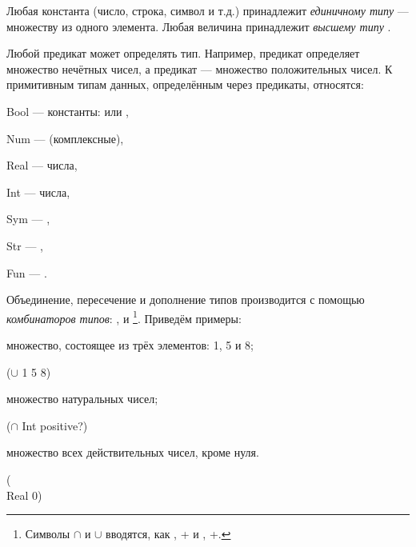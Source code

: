 Любая константа (число, строка, символ и т.д.) принадлежит \emph{единичному типу} --- множеству из одного элемента. Любая величина принадлежит \emph{высшему типу} .

Любой предикат может определять тип. Например, предикат  определяет множество нечётных чисел, а предикат  --- множество положительных чисел. К примитивным типам данных, определённым через предикаты, относятся:

\vspace{-\medskipamount}
\begin{type}
  \item Bool --- { константы:  или ,}
  \item Num --- { (комплексные),}
  \item Real --- { числа,}
  \item Int --- { числа,}
  \item Sym --- {,}
  \item Str --- {,}
  \item Fun --- {.}
\end{type}

Объединение, пересечение и дополнение типов производится с помощью \emph{комбинаторов типов}: \s{$\cup$}, \s{$\cap$} и \s{\\}\footnote{Символы $\cap$ и $\cup$ вводятся, как \s{\\cup}, +\s{\\} и \s{\\cap}, +\s{\\}.}. Приведём примеры:

\begin{example}{множество, состоящее из трёх элементов: 1, 5 и 8;}
  \begin{ExampleCode}
  ($\cup$ 1 5 8)
  \end{ExampleCode}
\end{example}
\vspace{-\bigskipamount}
\begin{example}{множество натуральных чисел;}
  \begin{ExampleCode}
  ($\cap$ Int positive?)
  \end{ExampleCode}
\end{example}
\vspace{-\bigskipamount}
\begin{example}{множество всех действительных чисел, кроме нуля.}
  \begin{ExampleCode}
  (\\ Real 0)
  \end{ExampleCode}
\end{example}

